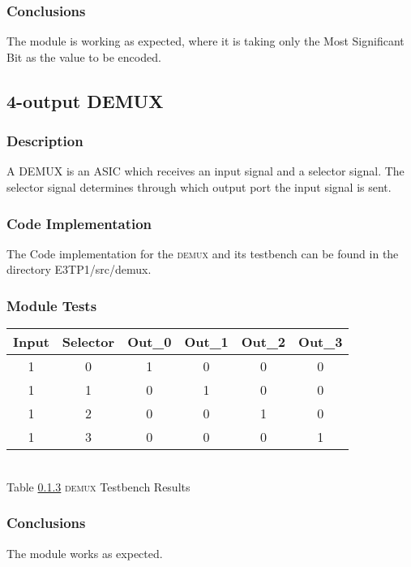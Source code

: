 \subsubsection{\color{orange}Conclusions}
The module is working as expected, where it is taking only the Most Significant Bit as the value to be encoded.

\subsection{\color{purple}4-output DEMUX}

\subsubsection{\color{orange}Description}
A DEMUX is an ASIC which receives an input signal and a selector signal. The selector signal determines through which output port the input signal is sent.

\subsubsection{\color{orange}Code Implementation}
The Code implementation for the \textsc{demux} and its testbench can be found in the directory E3TP1/src/demux.

\subsubsection{\color{orange}Module Tests}
\label{subsec2}

\begin{center}
\begin{tabular}{|c|c|c|c|c|c|}
\hline
Input&Selector&Out\_0&Out\_1&Out\_2&Out\_3\\
\hline
1&0&1&0&0&0\\
1&1&0&1&0&0\\
1&2&0&0&1&0\\
1&3&0&0&0&1\\
\hline
\end{tabular}
\\\vspace{12pt}
Table \ref{subsec2} \textsc{demux} Testbench Results
\end{center}

\subsubsection{\color{orange}Conclusions}
The module works as expected.